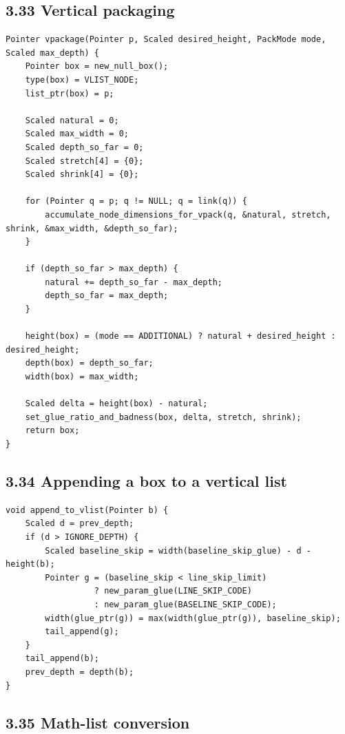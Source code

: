 \documentclass[11pt]{article}
\begin{document}
\subsection{3.33 Vertical packaging}\label{vertical-packaging}

\begin{verbatim}
Pointer vpackage(Pointer p, Scaled desired_height, PackMode mode, Scaled max_depth) {
    Pointer box = new_null_box();
    type(box) = VLIST_NODE;
    list_ptr(box) = p;

    Scaled natural = 0;
    Scaled max_width = 0;
    Scaled depth_so_far = 0;
    Scaled stretch[4] = {0};
    Scaled shrink[4] = {0};

    for (Pointer q = p; q != NULL; q = link(q)) {
        accumulate_node_dimensions_for_vpack(q, &natural, stretch, shrink, &max_width, &depth_so_far);
    }

    if (depth_so_far > max_depth) {
        natural += depth_so_far - max_depth;
        depth_so_far = max_depth;
    }

    height(box) = (mode == ADDITIONAL) ? natural + desired_height : desired_height;
    depth(box) = depth_so_far;
    width(box) = max_width;

    Scaled delta = height(box) - natural;
    set_glue_ratio_and_badness(box, delta, stretch, shrink);
    return box;
}
\end{verbatim}

\subsection{3.34 Appending a box to a vertical
list}\label{appending-a-box-to-a-vertical-list}

\begin{verbatim}
void append_to_vlist(Pointer b) {
    Scaled d = prev_depth;
    if (d > IGNORE_DEPTH) {
        Scaled baseline_skip = width(baseline_skip_glue) - d - height(b);
        Pointer g = (baseline_skip < line_skip_limit)
                  ? new_param_glue(LINE_SKIP_CODE)
                  : new_param_glue(BASELINE_SKIP_CODE);
        width(glue_ptr(g)) = max(width(glue_ptr(g)), baseline_skip);
        tail_append(g);
    }
    tail_append(b);
    prev_depth = depth(b);
}
\end{verbatim}

\subsection{3.35 Math-list conversion}\label{math-list-conversion}
\end{document}
